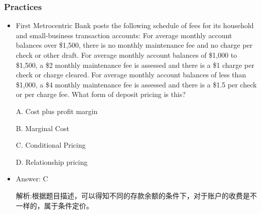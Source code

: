 \subsubsection{Practices}
\begin{itemize}
\item First Metrocentric Bank posts the following schedule of fees for its household and small-business transaction accounts: For average monthly account balances over \$1,500, there is no monthly maintenance fee and no charge per check or other draft. For average monthly account balances of \$1,000 to \$1,500, a \$2 monthly maintenance fee is assessed and there is a \$1 charge per check or charge cleared. For average monthly account balances of less than \$1,000, a \$4 monthly maintenance fee is assessed and there is a \$1.5 per check or per charge fee. What form of deposit pricing is this?

A. Cost plus profit margin

B. Marginal Cost

C. Conditional Pricing

D. Relationship pricing

\item Answer: C

解析:根据题目描述，可以得知不同的存款余额的条件下，对于账户的收费是不一样的，属于条件定价。
\end{itemize}



